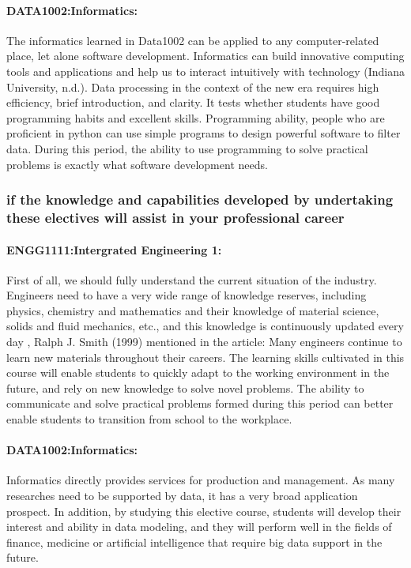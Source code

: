 \documentclass[../draft.tex]{subfiles}
\begin{document}
\paragraph{DATA1002:Informatics:}
The informatics learned in Data1002 can be applied to any computer-related place, let alone software development. Informatics can build innovative computing tools and applications and help us to interact intuitively with technology (Indiana University, n.d.). Data processing in the context of the new era requires high efficiency, brief introduction, and clarity. It tests whether students have good programming habits and excellent skills. Programming ability, people who are proficient in python can use simple programs to design powerful software to filter data. During this period, the ability to use programming to solve practical problems is exactly what software development needs.
\subsubsection{if the knowledge and capabilities developed by undertaking these electives will assist in your professional career}
\paragraph{ENGG1111:Intergrated Engineering 1:} 
First of all, we should fully understand the current situation of the industry. Engineers need to have a very wide range of knowledge reserves, including physics, chemistry and mathematics and their knowledge of material science, solids and fluid mechanics, etc., and this knowledge is continuously updated every day , Ralph J. Smith (1999) mentioned in the article: Many engineers continue to learn new materials throughout their careers. The learning skills cultivated in this course will enable students to quickly adapt to the working environment in the future, and rely on new knowledge to solve novel problems. The ability to communicate and solve practical problems formed during this period can better enable students to transition from school to the workplace.
\paragraph{DATA1002:Informatics:}
Informatics directly provides services for production and management. As many researches need to be supported by data, it has a very broad application prospect. In addition, by studying this elective course, students will develop their interest and ability in data modeling, and they will perform well in the fields of finance, medicine or artificial intelligence that require big data support in the future.
\end{document}
